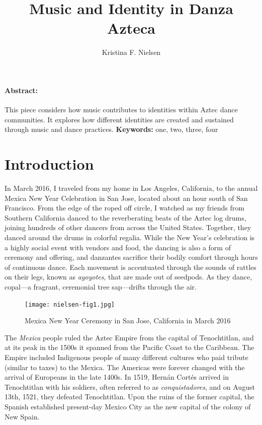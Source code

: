 \documentclass{article}
\title{Music and Identity in Danza Azteca}
\author{Kristina F. Nielsen}
\affil{Assistant Professor of Musicology\\Southern Methodist University}
\date{}
\providecommand{\keywords}[1]
{
  \newline
  \textbf{Keywords:} #1
}
\begin{document}
\maketitle

\paragraph{Abstract:}
  This piece considers how music contributes to identities within Aztec dance communities. It explores how different identities are created and sustained through music and dance practices.\keywords{one, two, three, four}

\section*{Introduction}
In March 2016, I traveled from my home in Los Angeles, California, to
the annual Mexica New Year Celebration in San Jose, located about an
hour south of San Francisco. From the edge of the roped off circle, I
watched as my friends from Southern California danced to the
reverberating beats of the Aztec log drums, joining hundreds of other
dancers from across the United States. Together, they danced around the
drums in colorful regalia. While the New Year's celebration is a highly
social event with vendors and food, the dancing is also a form of
ceremony and offering, and danzantes sacrifice their bodily comfort
through hours of continuous dance. Each movement is accentuated through
the sounds of rattles on their legs, known as \emph{ayoyotes}, that are
made out of seedpods. As they dance, copal---a fragrant, ceremonial tree
sap---drifts through the air.

\begin{figure}
  \texttt{[image: nielsen-fig1.jpg]}
  \caption{Mexica New Year Ceremony in San Jose, California in March 2016}
\end{figure}

The \emph{Mexica} people ruled the Aztec Empire from the capital of
Tenochtitlan, and at its peak in the 1500s it spanned from the Pacific
Coast to the Caribbean. The Empire included Indigenous people of many
different cultures who paid tribute (similar to taxes) to the Mexica.
The Americas were forever changed with the arrival of Europeans in the
late 1400s. In 1519, Hernán Cortés arrived in Tenochtitlan with his
soldiers, often referred to as \emph{conquistadores}, and on August
13th, 1521, they defeated Tenochtitlan. Upon the ruins of the former
capital, the Spanish established present-day Mexico City as the new
capital of the colony of New Spain.
\end{document}
